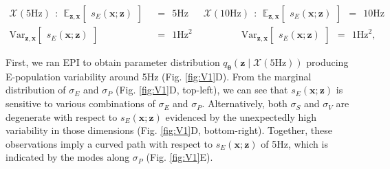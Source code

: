 \documentclass[11pt]{article}
\begin{document}
\begin{equation}\label{eq:EP_V1}
\begin{split}
\mathcal{X}(5\text{Hz}) ~~:~~  \mathbb{E}_{\mathbf{z}, 
\mathbf{x}}\begin{bmatrix} s_E(\mathbf{x}; \mathbf{z}) \end{bmatrix}  &~~=~~ 5\text{Hz}~~~~~~~\mathcal{X}(10\text{Hz}) ~~:~~  \mathbb{E}_{\mathbf{z}, 
\mathbf{x}}\begin{bmatrix} s_E(\mathbf{x}; \mathbf{z}) \end{bmatrix}  ~~=~~ 10\text{Hz}  \\ 
 \text{Var}_{\mathbf{z}, 
\mathbf{x}}\begin{bmatrix} s_E(\mathbf{x}; \mathbf{z}) \end{bmatrix}  &~~=~~  1 \text{Hz}^2~~~~~~~~~~~~~~~~~~~~~~~ \text{Var}_{\mathbf{z}, 
\mathbf{x}}\begin{bmatrix} s_E(\mathbf{x}; \mathbf{z}) \end{bmatrix}  ~~=~~  1 \text{Hz}^2,
\end{split}
\end{equation}

First, we ran EPI to obtain parameter distribution $q_{\bm{\theta}}(\mathbf{z} \mid \mathcal{X}(5\text{Hz}))$ producing E-population variability around 5Hz (Fig. \ref{fig:V1}D).
From the marginal distribution of $\sigma_E$ and $\sigma_P$ (Fig. \ref{fig:V1}D, top-left), we can see that $s_E(\mathbf{x}; \mathbf{z})$ is sensitive to various combinations of $\sigma_E$ and $\sigma_P$.
Alternatively, both $\sigma_S$ and $\sigma_V$ are degenerate with respect to $s_E(\mathbf{x}; \mathbf{z})$ evidenced by the unexpectedly high variability in those dimensions (Fig. \ref{fig:V1}D, bottom-right).
Together, these observations imply a curved path with respect to $s_E(\mathbf{x}; \mathbf{z})$ of 5Hz, which is indicated by the modes along $\sigma_P$ (Fig. \ref{fig:V1}E).
\end{document}
